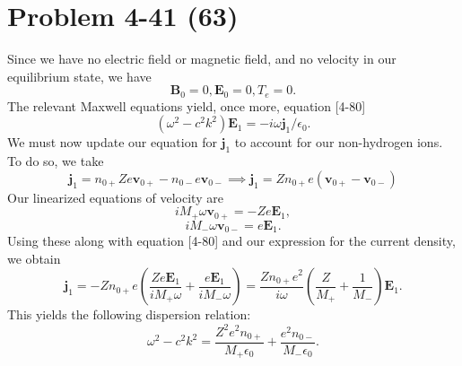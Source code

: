 \section*{Problem 4-41 (63)}
\label{sec:4-41}
Since we have no electric field or magnetic field, and no velocity in our equilibrium state, we have 
\begin{equation*}
	\bm{B}_0 = 0, \bm{E}_0 = 0, T_e = 0.
\end{equation*}
The relevant Maxwell equations yield, once more, equation [4-80]
\begin{equation*}
	(\omega^2 - c^2k^2 )\bm{E}_1 = -i\omega\bm{j}_1/\epsilon_0.
\end{equation*}
We must now update our equation for \(\bm{j}_1 \) to account for our non-hydrogen ions. To do so, we take
\begin{equation*}
	\bm{j}_1 = n_{0+}Ze\bm{v}_{0+} - n_{0-}e\bm{v}_{0-} \implies \bm{j}_1 = Zn_{0+}e\left(\bm{v}_{0+} - \bm{v}_{0-}\right)
\end{equation*}
Our linearized equations of velocity are
\begin{equation*}
	iM_+\omega\bm{v}_{0+} = -Ze\bm{E}_1,
\end{equation*}
\begin{equation*}
	iM_-\omega\bm{v}_{0-} = e\bm{E}_1.
\end{equation*}
Using these along with equation [4-80] and our expression for the current density, we obtain
\begin{equation*}
	\bm{j}_1 = -Zn_{0+}e\left(\dfrac{Ze\bm{E}_1}{iM_+\omega} + \dfrac{e\bm{E}_1}{iM_-\omega}\right) = \dfrac{Zn_{0+}e^2}{i\omega}\left(\dfrac{Z}{M_+} + \dfrac{1}{M_-}\right)\bm{E}_1.
\end{equation*}
This yields the following dispersion relation:
\begin{equation*}
	\omega^2 - c^2k^2 = \dfrac{Z^2e^2n_{0+}}{M_+\epsilon_0} + \dfrac{e^2n_{0-}}{M_-\epsilon_0}.
\end{equation*}

